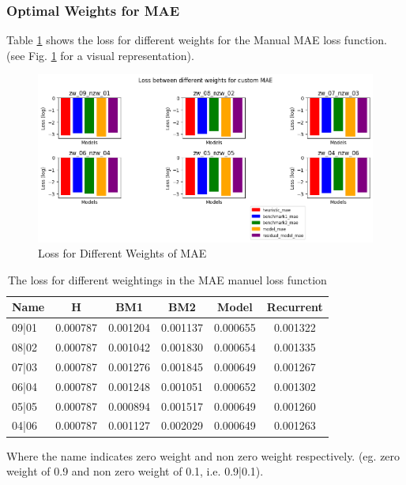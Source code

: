 \subsubsection*{Optimal Weights for MAE}
Table \ref{tab:weights} shows the loss for different weights for the Manual MAE loss function. (see Fig. \ref{fig:MAE-weights-init} for a visual representation). 
\begin{figure}[tbph]
	\centering
	\includegraphics[width=0.9\linewidth, height=0.5\textheight]{Figures/Results/Shuffle_Weights/weights/weights}
	\caption[Loss for Different Weights of MAE]{Loss for Different Weights of MAE}
	\label{fig:MAE-weights-init}
\end{figure}

\begin{table}[htbp]
	\centering
	\caption{The loss for different weightings in the MAE manuel loss function}
	\label{tab:weights}
	\begin{tabular}{p{2cm}ccccc}
		\toprule
		Name &  H &  BM1 &  BM2 &  Model &  Recurrent \\
		\midrule
		09|01 &       0.000787 &        0.001204 &        0.001137 &   0.000655 &            0.001322 \\
		08|02 &       0.000787 &        0.001042 &        0.001830 &   0.000654 &            0.001335 \\
		07|03 &       0.000787 &        0.001276 &        0.001845 &   0.000649 &            0.001267 \\
		06|04 &       0.000787 &        0.001248 &        0.001051 &   0.000652 &            0.001302 \\
		05|05 &       0.000787 &        0.000894 &        0.001517 &   0.000649 &            0.001260 \\
		04|06 &       0.000787 &        0.001127 &        0.002029 &   0.000649 &            0.001263 \\
		\bottomrule
	\end{tabular}
\end{table}
Where the name indicates zero weight and non zero weight respectively. (eg. zero weight of 0.9 and non zero weight of 0.1, i.e. 0.9|0.1). \\

